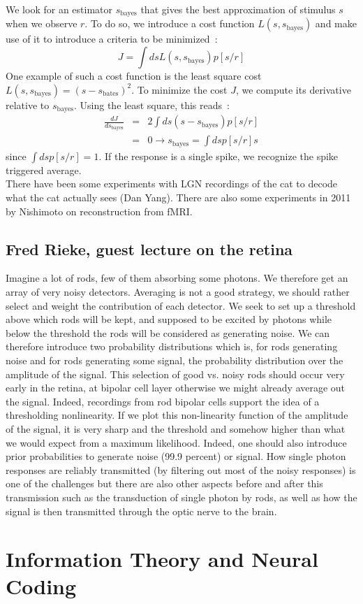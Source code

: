 \documentclass[10pt,a4paper]{article}
\begin{document}
We look for an estimator $s_{\mbox{bayes}}$ that gives the best
approximation of stimulus $s$ when we observe $r$. To do so, we
introduce a cost function $L(s, s_{\mbox{bayes}})$ and make use of it
to introduce a criteria to be minimized~:
\begin{equation}
J = \int ds L(s, s_{\mbox{bayes}}) p[s/r]
\end{equation}
One example of such a cost function is the least square cost $L(s,
s_{\mbox{bayes}}) = (s - s_{\mbox{bates}})^2$. To minimize the cost
$J$, we compute its derivative relative to $s_{\mbox{bayes}}$. Using
the least square, this reads~:
\begin{eqnarray}
\frac{dJ}{d s_{\mbox{bayes}}} &=& 2 \int ds(s - s_{\mbox{bayes}})
p[s/r]\\
&=& 0 \rightarrow s_{\mbox{bayes}} = \int ds p[s/r] s
\end{eqnarray}
since $\int ds p[s/r] = 1$. If the response is a single spike, we
recognize the spike triggered average.\\

There have been some experiments with LGN recordings of the cat to
decode what the cat actually sees (Dan Yang). There are also some
experiments in 2011 by Nishimoto on reconstruction from fMRI.\\


\subsection{Fred Rieke, guest lecture on the retina}

Imagine a lot of rods, few of them absorbing some photons. We
therefore get an array of very noisy detectors. Averaging is not a
good strategy, we should rather select and weight the contribution of
each detector. We seek to set up a threshold above which rods will be
kept, and supposed to be excited by photons while below the threshold
the rods will be considered as generating noise. We can therefore
introduce two probability distributions which is, for rods generating
noise and for rods generating some signal, the probability
distribution over the amplitude of the signal. This selection of good
vs. noisy rods should occur very early in the retina, at bipolar cell
layer otherwise we might already average out the signal. Indeed,
recordings from rod bipolar cells support the idea of a thresholding
nonlinearity. If we plot this non-linearity function of the amplitude
of the signal, it is very sharp and the threshold and somehow higher
than what we would expect from a maximum likelihood. Indeed, one
should also introduce prior probabilities to generate noise (99.9
percent) or signal. How single photon responses are reliably
transmitted (by filtering out most of the noisy responses) is one of
the challenges but there are also other aspects before and after this
transmission such as the transduction of single photon by rods, as
well as how the signal is then transmitted through the optic nerve to
the brain.



\section{Information Theory and Neural Coding}
\end{document}
